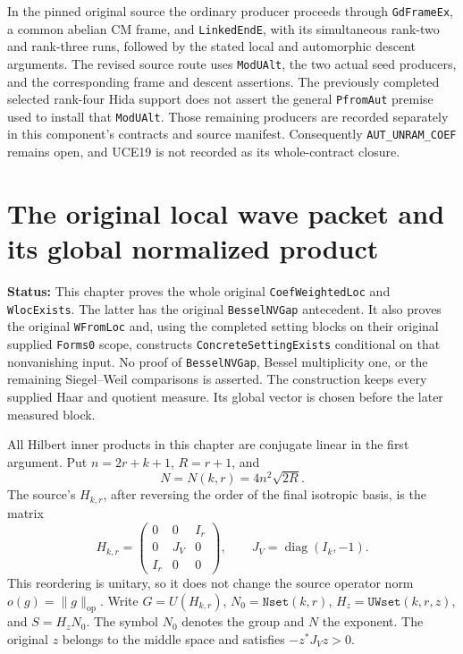 \documentclass[11pt,a4paper]{article}
\numberwithin{equation}{section}
\theoremstyle{remark}\newtheorem{remark}[theorem]{Remark}
\newcommand{\status}[1]{\textbf{Status:} #1}
\begin{document}
In the pinned original source the ordinary producer proceeds through
\texttt{Gd\allowbreak Frame\allowbreak Ex}, a common abelian CM frame, and
\texttt{Linked\allowbreak End\allowbreak E}, with its simultaneous rank-two and rank-three
runs, followed by the stated local and automorphic descent arguments.
The revised source route uses \texttt{Mod\allowbreak UAlt}, the two actual seed
producers, and the corresponding frame and descent assertions.
The previously completed selected rank-four Hida support does not
assert the general \texttt{Pfrom\allowbreak Aut} premise used to install that
\texttt{Mod\allowbreak UAlt}.  Those remaining producers are recorded separately
in this component's contracts and source manifest.  Consequently
\texttt{AUT\_\allowbreak UNRAM\_\allowbreak COEF} remains open, and UCE19 is not recorded as
its whole-contract closure.


\section{The original local wave packet and its global normalized product}
\label{sec:bessel-wave-packets-v49}

\status{This chapter proves the whole original \texttt{Coef\allowbreak Weighted\allowbreak Loc}
and \texttt{Wloc\allowbreak Exists}.  The latter has the original
\texttt{Bessel\allowbreak NVGap} antecedent.  It also proves the original
\texttt{WFrom\allowbreak Loc} and, using the completed setting blocks on their
original supplied \texttt{Forms0} scope, constructs
\texttt{Concrete\allowbreak Setting\allowbreak Exists} conditional on that
nonvanishing input.  No proof of \texttt{Bessel\allowbreak NVGap}, Bessel
multiplicity one, or the remaining Siegel--Weil comparisons is asserted.
The construction keeps every supplied Haar and quotient measure.
Its global vector is chosen before the later measured block.}

All Hilbert inner products in this chapter are conjugate linear in the
first argument.  Put \(n=2r+k+1\), \(R=r+1\), and
\[
 N=N(k,r)=4n^2\sqrt{2R}.
 \tag{BWP.1}
\]
The source's \(H_{k,r}\), after reversing the order of the final
isotropic basis, is the matrix
\[
 H_{k,r}=\begin{pmatrix}0&0&I_r\\0&J_V&0\\I_r&0&0\end{pmatrix},
 \qquad J_V=\operatorname{diag}(I_k,-1).
 \tag{BWP.2}
\]
This reordering is unitary, so it does not change the source operator
norm \(o(g)=\|g\|_{\mathrm{op}}\).  Write \(G=U(H_{k,r})\),
\(N_0=\texttt{Nset}(k,r)\), \(H_z=\texttt{UWset}(k,r,z)\),
and \(S=H_zN_0\).  The symbol \(N_0\) denotes the group and
\(N\) the exponent.  The original \(z\) belongs to the middle
space and satisfies \(-z^*J_Vz>0\).
\end{document}
